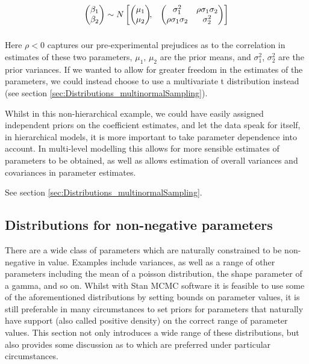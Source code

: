 \documentclass[11pt,fullpage]{book}
\begin{document}
\begin{align*}
\begin{pmatrix}\beta_{1}\\
\beta_{2}
\end{pmatrix} &\sim  N
\begin{bmatrix}
\begin{pmatrix}
\mu_1\\
\mu_2
\end{pmatrix}\!\!,&
\begin{pmatrix}
\sigma_1^2 & \rho\sigma_1\sigma_2\\
\rho\sigma_1\sigma_2 & \sigma_2^2
\end{pmatrix}
\end{bmatrix}\\[2\jot]
\end{align*}


Here $\rho<0$ captures our pre-experimental prejudices as to the correlation in estimates of these two parameters, $\mu_1$, $\mu_2$ are the prior means, and $\sigma_1^2$, $\sigma_2^2$ are the prior variances. If we wanted to allow for greater freedom in the estimates of the parameters, we could instead choose to use a multivariate t distribution instead (see section \ref{sec:Distributions_multinormalSampling}).

Whilst in this non-hierarchical example, we could have easily assigned independent priors on the coefficient estimates, and let the data speak for itself, in hierarchical models, it is more important to take parameter dependence into account. In multi-level modelling this allows for more sensible estimates of parameters to be obtained, as well as allows estimation of overall variances and covariances in parameter estimates.

See section \ref{sec:Distributions_multinormalSampling}.

\subsection{Distributions for non-negative parameters}
There are a wide class of parameters which are naturally constrained to be non-negative in value. Examples include variances, as well as a range of other parameters including the mean of a poisson distribution, the shape parameter of a gamma, and so on. Whilst with Stan MCMC software it is feasible to use some of the aforementioned distributions by setting bounds on parameter values, it is still preferable in many circumstances to set priors for parameters that naturally have support (also called positive density) on the correct range of parameter values. This section not only introduces a wide range of these distributions, but also provides some discussion as to which are preferred under particular circumstances.
\end{document}

